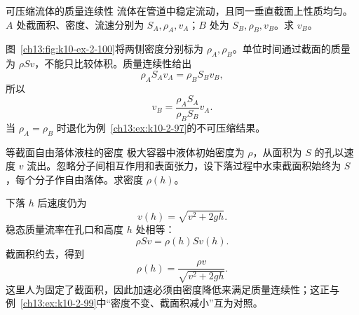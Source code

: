 {\begin{origexamplebox}{可压缩流体的质量连续性}\label{ch13:ex:k10-2-100}
流体在管道中稳定流动，且同一垂直截面上性质均匀。$A$ 处截面积、密度、流速分别为 $S_A,\rho_A,v_A$；$B$ 处为 $S_B,\rho_B,v_B$。求 $v_B$。

\CompressiblePipeDiagram
\end{origexamplebox}
\begin{xesolution}
\ThAFlowMass

图~\ref{ch13:fig:k10-ex-2-100}将两侧密度分别标为 $\rho_A,\rho_B$。单位时间通过截面的质量为 $\rho Sv$，不能只比较体积。质量连续性给出
\[
\rho_AS_Av_A=\rho_BS_Bv_B,
\]
所以
\[
\boxed{v_B=\frac{\rho_AS_A}{\rho_BS_B}v_A}.
\]
当 $\rho_A=\rho_B$ 时退化为例~\ref{ch13:ex:k10-2-97}的不可压缩结果。
\end{xesolution}

\begin{origexamplebox}{等截面自由落体液柱的密度}\label{ch13:ex:k10-2-101}
极大容器中液体初始密度为 $\rho$，从面积为 $S$ 的孔以速度 $v$ 流出。忽略分子间相互作用和表面张力，设下落过程中水束截面积始终为 $S$，每个分子作自由落体。求密度 $\rho(h)$。

\ThQDilutingColumn
\end{origexamplebox}
\begin{xesolution}
\ThADilutingColumn

下落 $h$ 后速度仍为
\[
v(h)=\sqrt{v^2+2gh}.
\]
稳态质量流率在孔口和高度 $h$ 处相等：
\[
\rho Sv=\rho(h)S v(h).
\]
截面积约去，得到
\[
\boxed{\rho(h)=\frac{\rho v}{\sqrt{v^2+2gh}}}.
\]
这里人为固定了截面积，因此加速必须由密度降低来满足质量连续性；这正与例~\ref{ch13:ex:k10-2-99}中“密度不变、截面积减小”互为对照。
\end{xesolution}
}

